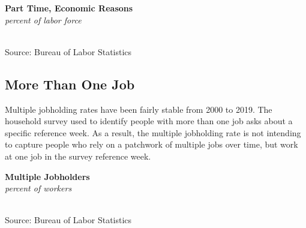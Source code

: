 \documentclass{report}
\makeatletter
\newcommand{\tbllink}[1]{\href{https://raw.githubusercontent.com/bdecon/US-chartbook/master/chartbook/data/#1}{\faTable}}
\newcommand*\short[1]{\expandafter\@gobbletwo\number\numexpr#1\relax}
\newcommand{\shdateaxisticks}{
		date coordinates in=x, axis line style={draw=none},
		xmax={2022-01-30},
		max space between ticks=40,	    
		xtick={{1990-01-01}, {1995-01-01}, {2000-01-01}, 
			{2005-01-01}, {2010-01-01}, {2015-01-01}, {2020-01-01}},
		minor xtick={},
		enlarge y limits={0.06}, enlarge x limits={0.01},
		}
\newcommand{\stdline}[4]{\addplot[very thick, no markers, color=#1] 
		table [x=#2, y=#3, col sep=comma] {#4};	}
\newcommand{\thinline}[4]{\addplot[no markers, color=#1] 
		table [x=#2, y=#3, col sep=comma] {#4};	}
\newcommand{\rbars}{
		\fill[color=black!10] (axis cs:{1990-07-01},\pgfkeysvalueof{/pgfplots/ymin}) rectangle 
			(axis cs:{1991-03-01}, \pgfkeysvalueof{/pgfplots/ymax});
		\fill[color=black!10] (axis cs:{2007-12-01},\pgfkeysvalueof{/pgfplots/ymin}) rectangle 
			(axis cs:{2009-07-01}, \pgfkeysvalueof{/pgfplots/ymax});
		\fill[color=black!10] (axis cs:{2001-03-01},\pgfkeysvalueof{/pgfplots/ymin}) rectangle 
			(axis cs:{2001-11-01}, \pgfkeysvalueof{/pgfplots/ymax});
		\fill[color=black!10] (axis cs:{2020-02-01},\pgfkeysvalueof{/pgfplots/ymin}) rectangle 
			(axis cs:{2020-05-01}, \pgfkeysvalueof{/pgfplots/ymax});}
\newcommand{\rebars}{
		\fill[color=black!10] (axis cs:{2007-12-01},\pgfkeysvalueof{/pgfplots/ymin}) rectangle 
			(axis cs:{2009-07-01}, \pgfkeysvalueof{/pgfplots/ymax});
		\fill[color=black!10] (axis cs:{2001-03-01},\pgfkeysvalueof{/pgfplots/ymin}) rectangle 
			(axis cs:{2001-11-01}, \pgfkeysvalueof{/pgfplots/ymax});
		\fill[color=black!10] (axis cs:{2020-02-01},\pgfkeysvalueof{/pgfplots/ymin}) rectangle 
			(axis cs:{2020-05-01}, \pgfkeysvalueof{/pgfplots/ymax});}
\makeatother
\begin{document}
{{\begin{minipage}{0.408\textwidth}
\normalsize \textbf{Part Time, Economic Reasons}\\
\footnotesize{\textit{percent of labor force}}\\
\hspace*{-2mm} \\
\footnotesize{Source: Bureau of Labor Statistics} \hfill \tbllink{ptecon.csv} 
\end{minipage}
\hspace{5mm}
\begin{minipage}{0.31\textwidth}
\small 
\end{minipage}
\vspace{6mm}

\begin{minipage}{0.76\textwidth}
\subsection*{\color{black!70} \seriffont More Than One Job}
\small Multiple jobholding rates have been fairly stable from 2000 to 2019. The household survey used to identify people with more than one job asks about a specific reference week. As a result, the multiple jobholding rate is not intending to capture people who rely on a patchwork of multiple jobs over time, but work at one job in the survey reference week. 
\end{minipage}

\begin{minipage}{0.43\textwidth}
\normalsize \textbf{Multiple Jobholders}\\
\footnotesize{\textit{percent of workers}}\\
\hspace*{-2mm} \\
\footnotesize{Source: Bureau of Labor Statistics} \hfill \tbllink{mjh.csv} 
\end{minipage}
\hspace{7mm}
\begin{minipage}{0.28\textwidth}
\small 
\end{minipage}
\newpage
\begin{minipage}{0.76\textwidth}

\end{minipage}}}
\end{document}
